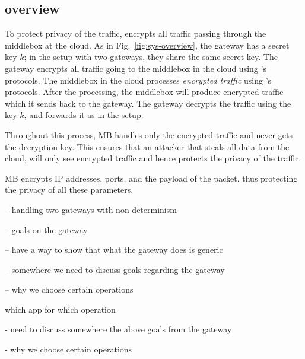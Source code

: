\subsection{\sys overview}

To protect privacy of the traffic, \sys encrypts all traffic passing through the middlebox at the cloud. 
As in Fig.~\ref{fig:sys-overview}, the gateway has a secret key $k$; in the setup with two gateways, they share
the same secret key. The gateway encrypts all traffic going to the middlebox in the cloud using \sys's protocols.
The middlebox in the cloud processes {\em encrypted traffic} using \sys's protocols. 
After the processing, the middlebox
will produce encrypted traffic which it sends back to the gateway. The gateway decrypts the traffic using the key $k$, 
and forwards it as in the setup.

Throughout this process, MB handles only the encrypted traffic and never gets the decryption key. This ensures
that an attacker that steals all data from the cloud, will only see encrypted traffic and hence protects the privacy of the 
traffic. 

MB encrypts IP addresses, ports, and the payload of the packet, thus protecting the privacy of all these parameters. 





-- handling two gateways with non-determinism




-- goals on the gateway

-- have a way to show that what the gateway does is generic 
   
-- somewhere we need to discuss goals regarding the gateway

-- why we choose certain operations

which app for which operation


- need to discuss somewhere the above goals from the gateway


- why we choose certain operations

